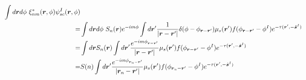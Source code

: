\documentclass [10pt,letterpaper]{article}
\newcommand{\unitvectorsym}[1]{\hat{\vectorsym{#1}}}
\begin{document}
\begin{subequations}
\begin{align}
\begin{split}
			\int d\vectorsym{r} d\phi
			\ \xi^*_{n m}(\vectorsym{r},\phi)
			\psi_{sc}^I(\vectorsym{r},\phi)
			\\
			=&
			\int d\vectorsym{r} d\phi
			\ S_n(\vectorsym{r})
			e^{-i m \phi}
			\int d\vectorsym{r}^\prime
			\frac
			{1}
			{\lvert \vectorsym{r}-\vectorsym{r}^\prime \rvert}
			\delta(\phi-\phi_{\vectorsym{r}-\vectorsym{r}^\prime})
			\mu_s(\vectorsym{r}^\prime)
			f(\phi_{\vectorsym{r}-\vectorsym{r}^\prime}-\phi^I)
			e^{-\tau(\vectorsym{r}^\prime,-\unitvectorsym{s}^I)} 
			\\
			=&
			\int d\vectorsym{r}
			S_n(\vectorsym{r})
			\int d\vectorsym{r}^\prime
			\frac
			{
				e^{-i m \phi_{\vectorsym{r}-\vectorsym{r}^\prime}}
			}
			{\lvert \vectorsym{r}-\vectorsym{r}^\prime \rvert}
			\mu_s(\vectorsym{r}^\prime)
			f(\phi_{\vectorsym{r}-\vectorsym{r}^\prime}-\phi^I)
			e^{-\tau(\vectorsym{r}^\prime,-\unitvectorsym{s}^I)} 
			\\
			=&
			S(n)
			\int d\vectorsym{r}^\prime
			\frac
			{
				e^{-i m \phi_{\vectorsym{r}_n-\vectorsym{r}^\prime}}
			}
			{\lvert \vectorsym{r}_n-\vectorsym{r}^\prime \rvert}
			\mu_s(\vectorsym{r}^\prime)
			f(\phi_{\vectorsym{r}_n-\vectorsym{r}^\prime}-\phi^I)
			e^{-\tau(\vectorsym{r}^\prime,-\unitvectorsym{s}^I)} 
		\end{split}
		\label{eq:der-Vscnm-1pt}
	\end{align}
\end{subequations}
\end{document}
